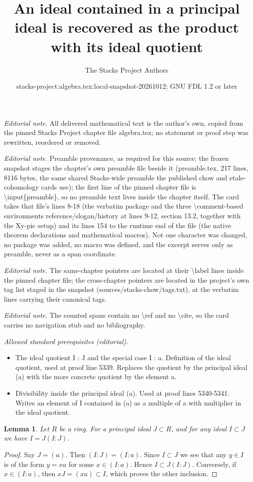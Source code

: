 \documentclass[10pt,a4paper]{amsart}
\title{An ideal contained in a principal ideal is recovered as the product with its ideal quotient}
\author{The Stacks Project Authors}
\date{stacks-project:algebra.tex:local-snapshot-20261012; GNU FDL 1.2 or later}
\theoremstyle{plain}
\newtheorem{lemma}[subsection]{Lemma}
\theoremstyle{definition}
\theoremstyle{remark}
\numberwithin{equation}{subsection}
\begin{document}
\maketitle
\noindent\textit{Editorial note.} All delivered mathematical text is the author's own, copied from the pinned Stacks Project chapter file algebra.tex; no statement or proof step was rewritten, reordered or removed.\par\medskip
\noindent\textit{Editorial note.} Preamble provenance, as required for this source: the frozen snapshot stages the chapter's own preamble file beside it (preamble.tex, 217 lines, 8116 bytes, the same shared Stacks-wide preamble the published chow and etale-cohomology cards use); the first line of the pinned chapter file is \textbackslash{}input\{preamble\}, so no preamble text lives inside the chapter itself. The card takes that file's lines 8-18 (the verbatim package and the three \textbackslash{}comment-based environments reference/slogan/history at lines 9-12, section 13.2, together with the Xy-pic setup) and its lines 154 to the runtime end of the file (the native theorem declarations and mathematical macros). Not one character was changed, no package was added, no macro was defined, and the excerpt serves only as preamble, never as a span coordinate.\par\medskip
\noindent\textit{Editorial note.} The same-chapter pointers are located at their \textbackslash{}label lines inside the pinned chapter file; the cross-chapter pointers are located in the project's own tag list staged in the snapshot (sources/stacks-chow/tags.txt), at the verbatim lines carrying their canonical tags.\par\medskip
\noindent\textit{Editorial note.} The counted spans contain no \textbackslash{}ref and no \textbackslash{}cite, so the card carries no navigation stub and no bibliography.\par\medskip
\noindent\textit{Allowed standard prerequisites (editorial).}\begin{itemize}
\item The ideal quotient I : J and the special case I : a. Definition of the ideal quotient, used at proof line 5339. Replaces the quotient by the principal ideal (a) with the more concrete quotient by the element a.
\item Divisibility inside the principal ideal (a). Used at proof lines 5340-5341. Writes an element of I contained in (a) as a multiple of a with multiplier in the ideal quotient.
\end{itemize}\medskip
\begin{lemma}
\label{lemma-colon}
Let $R$ be a ring. For a principal ideal $J \subset R$, and for any ideal
$I \subset J$ we have $I = J (I : J)$.
\end{lemma}

\begin{proof}
Say $J = (a)$. Then $(I : J) = (I : a)$.
Since $I \subset J$ we see that any $y \in I$ is of the form
$y = xa$ for some $x \in (I : a)$. Hence $I \subset J (I : J)$.
Conversely, if $x \in (I : a)$, then $xJ = (xa) \subset I$, which
proves the other inclusion.
\end{proof}
\end{document}
